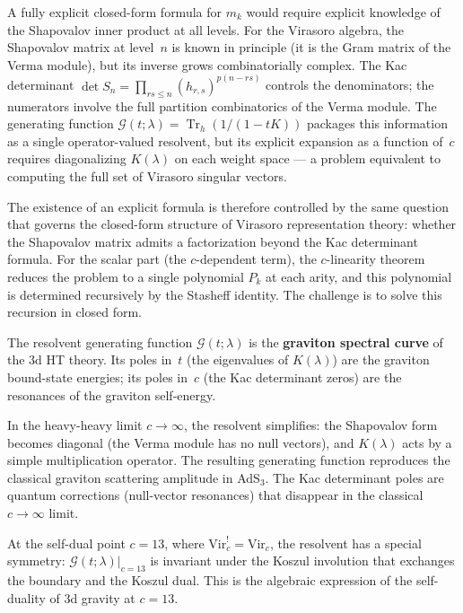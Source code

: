 \documentclass[11pt]{article}
\newcommand{\Tr}{\operatorname{Tr}}
\begin{document}
\begin{remark}
\label{rem:obstruction-to-closed-form-wn}
A fully explicit closed-form formula for $m_k$ would require
explicit knowledge of the Shapovalov inner product at all levels.
For the Virasoro algebra, the Shapovalov matrix at level~$n$ is
known in principle (it is the Gram matrix of the Verma module), but
its inverse grows combinatorially complex.  The Kac determinant
$\det S_n = \prod_{rs \le n} (h_{r,s})^{p(n-rs)}$ controls the
denominators; the numerators involve the full partition
combinatorics of the Verma module.  The generating function
$\mathcal{G}(t;\lambda) = \Tr_h(1/(1-tK))$ packages this information
as a single operator-valued resolvent, but its explicit expansion
as a function of~$c$ requires diagonalizing $K(\lambda)$ on
each weight space --- a problem equivalent to computing the
full set of Virasoro singular vectors.

The existence of an explicit formula is therefore controlled by
the same question that governs the closed-form structure of
Virasoro representation theory: whether the Shapovalov matrix
admits a factorization beyond the Kac determinant formula.
For the scalar part (the $c$-dependent term), the $c$-linearity
theorem reduces the problem to a single polynomial $P_k$ at each
arity, and this polynomial is determined recursively by the
Stasheff identity.  The challenge is to solve this recursion in
closed form.
\end{remark}

\begin{remark}
\label{rem:physical-generating-function-wn}
The resolvent generating function $\mathcal{G}(t;\lambda)$
is the \textbf{graviton spectral curve} of the 3d HT theory.
Its poles in~$t$ (the eigenvalues of $K(\lambda)$) are the
graviton bound-state energies; its poles in~$c$ (the Kac
determinant zeros) are the resonances of the graviton
self-energy.

In the heavy-heavy limit $c \to \infty$, the resolvent
simplifies: the Shapovalov form becomes diagonal (the Verma
module has no null vectors), and $K(\lambda)$ acts by a simple
multiplication operator.  The resulting generating function
reproduces the classical graviton scattering amplitude in
AdS$_3$.  The Kac determinant poles are quantum corrections
(null-vector resonances) that disappear in the classical
$c \to \infty$ limit.

At the self-dual point $c = 13$, where
$\mathrm{Vir}_c^! = \mathrm{Vir}_c$, the resolvent has a
special symmetry: $\mathcal{G}(t;\lambda)|_{c=13}$ is invariant under
the Koszul involution that exchanges the boundary and the Koszul
dual.  This is the algebraic expression of the self-duality of
3d gravity at $c = 13$.
\end{remark}
\end{document}
